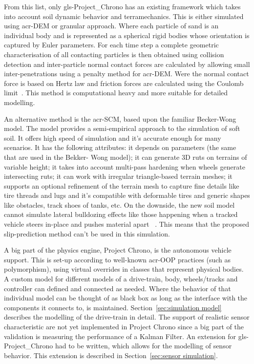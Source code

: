 From this list, only \gls{gls-Project_Chrono} has an existing framework which takes into account soil dynamic
behavior and
terramechanics. This is either simulated using \gls{acr-DEM} or granular approach. Where each particle of sand is
an individual body and is represented as a spherical rigid bodies whose orientation is captured by Euler parameters.
For each time step a complete geometric characterisation of all contacting particles is then obtained using collision
detection and inter-particle normal contact forces are calculated by allowing small inter-penetrations using a penalty
method for \gls{acr-DEM}. Were the normal contact force is based on Hertz law and friction forces are calculated using
the Coulomb limit~\cite{recuero_high-fidelity_2017}\cite{serban_co-simulation_2018}. This method is computational heavy
and more suitable for detailed modelling.

An alternative method is the \gls{acr-SCM}, based upon the familiar Becker-Wong model. The model provides a
semi-empirical approach to the simulation of soft soil. It offers high speed of simulation and it's accurate enough for
many scenarios. It has the following attributes: it depends on parameters (the same that are used in the Bekker- Wong
model); it can generate 3D ruts on terrains of variable height; it takes into account multi-pass hardening when wheels
generate intersecting ruts; it can work with irregular triangle-based terrain meshes; it supports an optional refinement
of the terrain mesh to capture fine details like tire threads and lugs and it's compatible with deformable tires and
generic shapes like obstacles, track shoes of tanks, etc. On the downside, the new soil model cannot simulate lateral
bulldozing effects like those happening when a tracked vehicle steers in-place and pushes material apart~
\cite{tasora_overview_2018}. This means that the proposed slip-prediction method can't be used in this simulation.

A big part of the physics engine, Project Chrono, is the autonomous vehicle support. This is set-up according to 
well-known \gls{acr-OOP} practices (such as polymorphism), using virtual overrides in classes that represent physical
bodies. A custom model for different models of a drive-train, body, wheels/tracks and controller can defined and 
connected as needed. Where the behavior of that individual model can be thought of as black box as long as the 
interface with the components it connects to, is maintained. Section~\ref{sec:simulation model} describes the 
modelling of the drive-train in detail. The support of realistic sensor characteristic are not yet implemented in 
Project Chrono since a big part of the validation is measuring the performance of a Kalman Filter. An extension for 
\gls{gls-Project_Chrono} had to be written, which allows for the modelling of sensor behavior. This extension is 
described in Section~\ref{sec:sensor simulation}.

